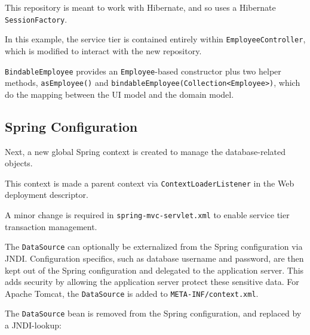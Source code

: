 \documentclass{article}
\begin{document}


This repository is meant to work with Hibernate, and so uses a Hibernate \texttt{SessionFactory}.

In this example, the service tier is contained entirely within \texttt{EmployeeController}, which is modified to interact with the new repository.

\texttt{BindableEmployee} provides an \texttt{Employee}-based constructor plus two helper methods, \texttt{asEmployee()} and \texttt{bindableEmployee(Collection<Employee>)}, which do the mapping between the UI model and the domain model.



\subsection{Spring Configuration}

Next, a new global Spring context is created to manage the database-related objects.



This context is made a parent context via \texttt{ContextLoaderListener} in the Web deployment descriptor.



A minor change is required in \texttt{spring-mvc-servlet.xml} to enable service tier transaction management.



The \texttt{DataSource} can optionally be externalized from the Spring configuration via JNDI.  Configuration specifics, such as database username and password, are then kept out of the Spring configuration and delegated to the application server.  This adds security by allowing the application server protect these sensitive data.  For Apache Tomcat, the \texttt{DataSource} is added to \texttt{META-INF/context.xml}.



The \texttt{DataSource} bean is removed from the Spring configuration, and replaced by a JNDI-lookup:
\end{document}
